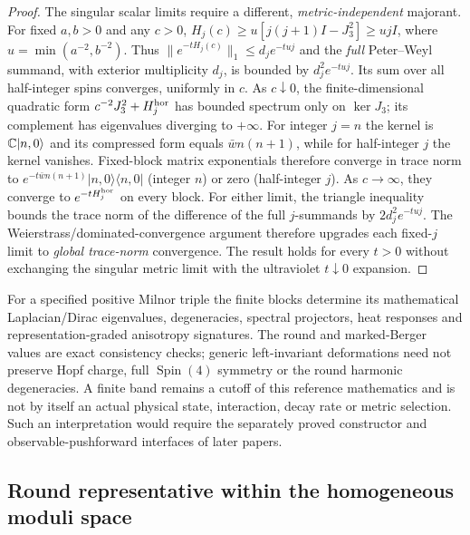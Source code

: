 \documentclass[11pt]{article}
\begin{document}
\begin{proof}
The singular scalar limits require a different, \emph{metric-independent}
majorant.  For fixed $a,b>0$ and any $c>0$,
$H_j(c)\ge u[j(j+1)I-J_3^2]\ge ujI$, where
$u=\min(a^{-2},b^{-2})$.  Thus
$\|e^{-tH_j(c)}\|_1\le d_je^{-tuj}$ and the \emph{full}
Peter--Weyl summand, with exterior multiplicity $d_j$, is bounded
by $d_j^2e^{-tuj}$.  Its sum over all half-integer spins converges,
uniformly in $c$.  As $c\downarrow0$, the finite-dimensional
quadratic form $c^{-2}J_3^2+H_j^{\rm hor}$ has bounded spectrum only
on $\ker J_3$; its complement has eigenvalues diverging to $+\infty$.
For integer $j=n$ the kernel is $\mathbb{C}|n,0\rangle$ and its compressed
form equals $\bar w n(n+1)$, while for half-integer $j$ the kernel
vanishes.  Fixed-block matrix exponentials therefore converge in
trace norm to $e^{-t\bar w n(n+1)}|n,0\rangle\langle n,0|$
(integer $n$) or zero (half-integer $j$).  As $c\to\infty$, they
converge to $e^{-tH_j^{\rm hor}}$ on every block.
For either limit, the triangle inequality bounds the trace norm of
the difference of the full $j$-summands by
$2d_j^2e^{-tuj}$.  The Weierstrass/dominated-convergence argument
therefore upgrades each fixed-$j$ limit to \emph{global trace-norm}
convergence.  The result holds for every $t>0$ without exchanging the
singular metric limit with the ultraviolet $t\downarrow0$ expansion.

\end{proof}

\begin{remark}
\label{p1:rem:general-spectral-compiler-scope}
For a specified positive Milnor triple the finite blocks determine its
mathematical Laplacian/Dirac eigenvalues, degeneracies, spectral projectors,
heat responses and representation-graded anisotropy signatures.  The
round and marked-Berger values are exact consistency checks; generic
left-invariant deformations need not preserve Hopf charge, full
$\operatorname{Spin}(4)$ symmetry or the round harmonic degeneracies.
A finite band remains a cutoff of this reference mathematics and is not
by itself an actual physical state, interaction, decay rate or metric
selection.  Such an interpretation would require the separately proved
constructor and observable-pushforward interfaces of later papers.
\end{remark}

\subsection{Round representative within the homogeneous moduli space}
\label{p1:subsec:homogeneous-round-representative}
\end{document}
